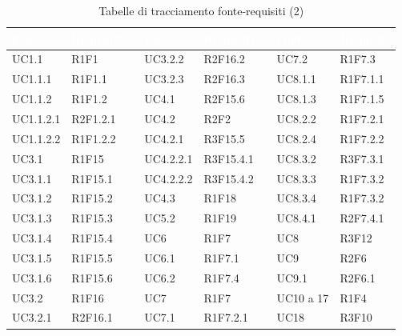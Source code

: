 {
\setlength\arrayrulewidth{1pt}
\begin{longtable}{C{2cm} | C{2cm} C{0.5cm} C{2cm} | C{2cm} C{0.5cm} C{2cm} | C{2cm}}
		\textcolor{white}{\textbf{Fonte}} & 
		\textcolor{white}{\textbf{Requisiti}} &
		 &
		\textcolor{white}{\textbf{Fonte}} & 
		\textcolor{white}{\textbf{Requisiti}} &
		 &
		\textcolor{white}{\textbf{Fonte}} & 
		\textcolor{white}{\textbf{Requisiti}} \\
		\endfirsthead
	    
	    \endfoot
	    \caption{Tabelle di tracciamento fonte-requisiti (2)}
	    \endlastfoot


UC1.1 & R1F1 &  & UC3.2.2 & R2F16.2 &  & UC7.2 & R1F7.3\\

UC1.1.1 & R1F1.1 &  & UC3.2.3 & R2F16.3 &  & UC8.1.1 & R1F7.1.1\\

UC1.1.2 & R1F1.2 &  & UC4.1 & R2F15.6 &  & UC8.1.3 & R1F7.1.5\\

UC1.1.2.1 & R2F1.2.1 &  & UC4.2 & R2F2 &  & UC8.2.2 & R1F7.2.1\\

UC1.1.2.2 & R1F1.2.2 &  & UC4.2.1 & R3F15.5 &   & UC8.2.4 & R1F7.2.2\\

UC3.1 & R1F15 &  & UC4.2.2.1 & R3F15.4.1 &  & UC8.3.2 & R3F7.3.1\\

UC3.1.1 & R1F15.1 &  & UC4.2.2.2 & R3F15.4.2 &  & UC8.3.3 & R1F7.3.2\\

UC3.1.2 & R1F15.2 &  & UC4.3 & R1F18 &  & UC8.3.4 & R1F7.3.2\\

UC3.1.3 & R1F15.3 &  & UC5.2 & R1F19 &  & UC8.4.1 & R2F7.4.1\\

UC3.1.4 & R1F15.4 &  & UC6 & R1F7 &  & UC8 & R3F12\\

UC3.1.5 & R1F15.5 &  & UC6.1 & R1F7.1 &  & UC9 & R2F6\\

UC3.1.6 & R1F15.6 &  & UC6.2 & R1F7.4 &  & UC9.1 & R2F6.1\\

UC3.2 & R1F16 &  & UC7 & R1F7 &  & UC10 a 17 & R1F4\\

UC3.2.1 & R2F16.1 &  & UC7.1 & R1F7.2.1 &  & UC18 & R3F10\\

\end{longtable}
}